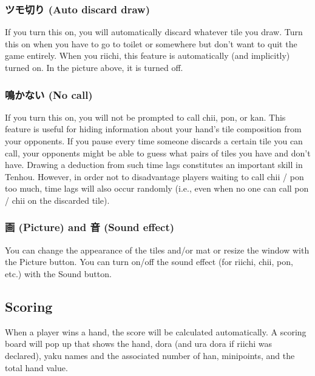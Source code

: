 \subsubsection{ツモ切り (Auto discard draw)}
If you turn this on, you will automatically discard whatever tile you draw. Turn this on when you have to go to toilet or somewhere but don't want to quit the game entirely. When you riichi, this feature is automatically (and implicitly) turned on. In the picture above, it is turned off.

\subsubsection{鳴かない (No call)}
If you turn this on, you will not be prompted to call {\jap chii}, {\jap pon}, or {\jap kan}. This feature is useful for hiding information about your hand's tile composition from your opponents. If you pause every time someone discards a certain tile you can call, your opponents might be able to guess what pairs of tiles you have and don't have. Drawing a deduction from such time lags constitutes an important skill in {\jap Tenhou}. However, in order not to disadvantage players waiting to call {\jap chii} / {\jap pon} too much, time lags will also occur randomly (i.e., even when no one can call {\jap pon} / {\jap chii} on the discarded tile).

\subsubsection{画 (Picture) and 音 (Sound effect)}
You can change the appearance of the tiles and/or mat or resize the window with the Picture button. You can turn on/off the sound effect (for riichi, {\jap chii}, {\jap pon}, etc.) with the Sound button.

\vfill

\subsection{Scoring}
When a player wins a hand, the score will be calculated automatically. A scoring board will pop up that shows the hand, {\jap dora} (and {\jap ura dora} if riichi was declared), {\jap yaku} names and the associated number of {\jap han}, minipoints, and the total hand value.

